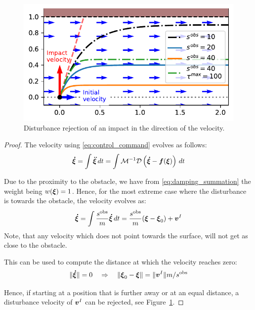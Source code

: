 \begin{figure}[htb]
\centering
  \centerline{\includegraphics[width=0.99\columnwidth]{figures/parallel_avoidance_obstacle}}
  \caption{Disturbance rejection of an impact in the direction of the velocity.}
  \label{fig:disturbance_with_parallel_velocity}
\end{figure}

\begin{proof}
The velocity using \eqref{eq:control_command} evolves as follows:
\begin{equation}
    \boldsymbol{\dot \xi} = \int \boldsymbol{\ddot \xi} \, dt = \int \mathcal{M}^{-1} \mathcal{D}  
	\left( \boldsymbol{\dot \xi} - \boldsymbol{f}(\boldsymbol{\xi}) \right) \, dt
\end{equation}

Due to the proximity to the obstacle, we have from \eqref{eq:damping_summation} the weight being $w(\boldsymbol{\xi}) = 1$. Hence, for the most extreme case where the disturbance is towards the obstacle, the velocity evolves as:
\begin{equation}
    \vecs{\dot \xi} = \int \frac{s^{\mathrm{obs}}}{m} \vecs{\dot \xi} \, dt = \frac{s^{\mathrm{obs}}}{m} (\vecs{\xi} - \vecs \xi_0)  + \vecs v^I \label{eq:velocity_with_control}
\end{equation}
Note, that any velocity which does not point towards the surface, will not get as close to the obstacle.

This can be used to compute the distance at which the velocity reaches zero:
\begin{equation}
    \| \boldsymbol{\dot \xi} \| = 0
    \quad \Rightarrow \quad
    \|\boldsymbol{\xi}_0 - \boldsymbol{\xi} \| = \| \boldsymbol{v}^I \| {m} / {s^{\mathrm{obs}}} 
\end{equation}

Hence, if starting at a position that is further away or at an equal distance, a disturbance velocity of $\boldsymbol{v}^I$ can be rejected, see Figure~\ref{fig:disturbance_with_parallel_velocity}.
\end{proof}

